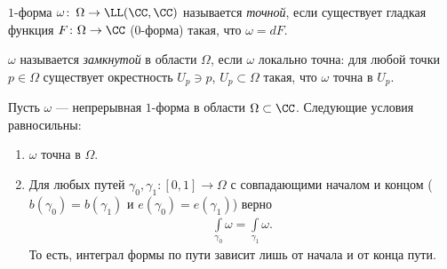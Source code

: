 \begin{df}
 $1$-форма $\omega \colon\, \Omega \to \LL(\CC,\CC)$ называется \textit{точной}, если существует гладкая функция $F \colon \Omega \to \CC $ ($0$-форма) такая, что $\omega = dF$.

 $\omega$ называется \textit{замкнутой} в области $\Omega$, если $\omega$ локально точна: для любой точки $p \in \Omega$ существует окрестность $U_p \ni p$, $U_p \subset \Omega$ такая, что $\omega$ точна в $U_p$.
\end{df}

\begin{thm}
 Пусть $\omega$ --- непрерывная $1$-форма в области $\Omega \subset \CC$. Следующие условия равносильны:
 \begin{enumerate}
  \item $\omega$ точна в $\Omega$.
  \item Для любых путей $\gamma_0, \gamma_1 \colon [0,1] \to \Omega$ с совпадающими началом и концом ($b(\gamma_0) = b(\gamma_1)$ и $e(\gamma_0) = e(\gamma_1)$) верно
   \begin{align*}
    \int\limits_{\gamma_0} \omega = \int\limits_{\gamma_1} \omega  
   .\end{align*} То есть, интеграл формы по пути зависит лишь от начала и от конца пути.
 \end{enumerate}
\end{thm}
